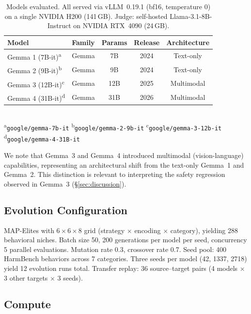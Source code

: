 \documentclass{article}
\begin{document}
\begin{table}[t]
\centering
\caption{Models evaluated. All served via vLLM~0.19.1 (bf16, temperature 0)
on a single NVIDIA H200 (141\,GB). Judge: self-hosted Llama-3.1-8B-Instruct
on NVIDIA RTX~4090 (24\,GB).}
\label{tab:models}
\begin{tabular}{llccc}
\toprule
\textbf{Model} & \textbf{Family} & \textbf{Params} & \textbf{Release} & \textbf{Architecture} \\
\midrule
Gemma 1 (7B-it)\textsuperscript{a}   & Gemma & 7B  & 2024 & Text-only \\
Gemma 2 (9B-it)\textsuperscript{b}   & Gemma & 9B  & 2024 & Text-only \\
Gemma 3 (12B-it)\textsuperscript{c}  & Gemma & 12B & 2025 & Multimodal \\
Gemma 4 (31B-it)\textsuperscript{d}  & Gemma & 31B & 2026 & Multimodal \\
\bottomrule
\end{tabular}
\\[2pt]
{\footnotesize
\textsuperscript{a}\texttt{google/gemma-7b-it}\quad
\textsuperscript{b}\texttt{google/gemma-2-9b-it}\quad
\textsuperscript{c}\texttt{google/gemma-3-12b-it}\quad
\textsuperscript{d}\texttt{google/gemma-4-31B-it}
}
\end{table}

We note that Gemma~3 and Gemma~4 introduced multimodal (vision-language)
capabilities, representing an architectural shift from the text-only
Gemma~1 and Gemma~2. This distinction is relevant to interpreting the
safety regression observed in Gemma~3 (\S\ref{sec:discussion}).

\subsection{Evolution Configuration}

MAP-Elites with $6 \times 6 \times 8$ grid (strategy $\times$ encoding
$\times$ category), yielding 288 behavioral niches. Batch size 50,
200 generations per model per seed, concurrency 5 parallel evaluations.
Mutation rate 0.3, crossover rate 0.7.
Seed pool: 400 HarmBench behaviors across 7 categories.
Three seeds per model (42, 1337, 2718) yield 12 evolution runs total.
Transfer replay: 36 source--target pairs (4 models $\times$ 3 other
targets $\times$ 3 seeds).

\subsection{Compute}
\end{document}
